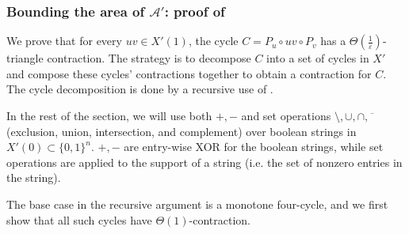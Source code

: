 


\subsubsection[Cone area of X']{Bounding the area of $\mathcal{A}'$: proof of } \label{sec:cone-area-X'}

We prove that for every $uv\in X'(1)$, the cycle $C = P_u\circ uv \circ P_v$ has a $\Theta(\frac{1}{\varepsilon})$-triangle contraction. 
The strategy is to decompose $C$ into a set of cycles in $X'$ and compose these cycles' contractions together to obtain a contraction for $C$. 
The cycle decomposition is done by a recursive use of .

In the rest of the section, we will use both $+,-$ and set operations $\setminus, \cup, \cap, \overline{\phantom{v}}$ (exclusion, union, intersection, and complement) over boolean strings in $X'(0) \subset \{0,1\}^n$. $+,-$ are entry-wise XOR for the boolean strings, while set operations are applied to the support of a string (i.e. the set of nonzero entries in the string). 


The base case in the recursive argument is a monotone four-cycle, and we first show that all such cycles have $\Theta(1)$-contraction. 

